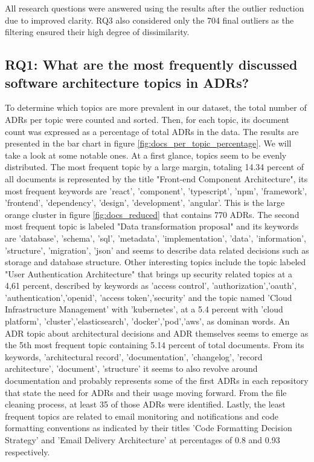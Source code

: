         All research questions were answered using the results after the outlier reduction due to improved clarity. RQ3 also considered only the 704 final outliers as the filtering ensured their high degree of dissimilarity.    
        
        \subsection{RQ1: What are the most frequently discussed software architecture topics in ADRs?}

        To determine which topics are more prevalent in our dataset, the total number of ADRs per topic were counted and sorted. Then, for each topic, its document count was expressed as a percentage of total ADRs in the data. The results are presented in the bar chart in figure \ref{fig:docs_per_topic_percentage}. We will take a look at some notable ones. At a first glance, topics seem to be evenly distributed. The most frequent topic by a large margin, totaling 14.34 percent of all documents is represented by the title "Front-end Component Architecture", its most frequent keywords are 'react', 'component', 'typescript', 'npm', 'framework', 'frontend', 'dependency', 'design', 'development', 'angular'. This is the large orange cluster in figure \ref{fig:docs_reduced} that contains 770 ADRs. The second most frequent topic is labeled "Data transformation proposal" and its keywords are 'database', 'schema', 'sql', 'metadata', 'implementation', 'data', 'information', 'structure', 'migration', 'json' and seems to describe data related decisions such as storage and database structure. Other interesting topics include the topic labeled "User Authentication Architecture" that brings up security related topics at a 4,61 percent, described by keywords as 'access control', 'authorization','oauth', 'authentication','openid', 'access token','security' and the topic named 'Cloud Infrastructure Management' with 'kubernetes', at a 5.4 percent with 'cloud platform', 'cluster','elasticsearch', 'docker','pod','aws', as dominan words. An ADR topic about architectural decisions and ADR themselves seems to emerge as the 5th most frequent topic containing 5.14 percent of total documents. From its keywords, 'architectural record', 'documentation', 'changelog', 'record architecture', 'document', 'structure' it seems to also revolve around documentation and probably represents some of the first ADRs in each repository that state the need for ADRs and their usage moving forward. From the file cleaning process, at least 35 of those ADRs were identified. Lastly, the least frequent topics are related to email monitoring and notifications and code formatting conventions as indicated by their titles 'Code Formatting Decision Strategy' and 'Email Delivery Architecture' at percentages of 0.8 and 0.93 respectively. 

